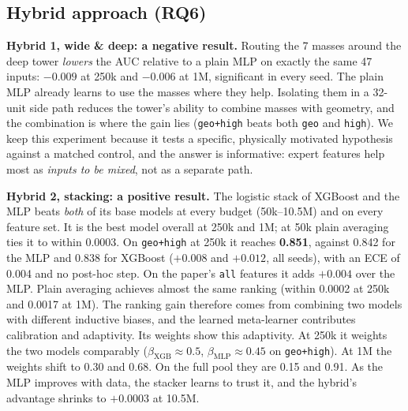 \subsection{Hybrid approach (RQ6)}
\textbf{Hybrid 1, wide \& deep: a negative result.} Routing the 7 masses around the deep tower
\emph{lowers} the AUC relative to a plain MLP on exactly the same 47 inputs: $-0.009$ at 250k and
$-0.006$ at 1M, significant in every seed. The plain MLP already learns to use the masses where they
help. Isolating them in a 32-unit side path reduces the tower's ability to combine masses with
geometry, and the combination is where the gain lies (\texttt{geo+high} beats both
\texttt{geo} and \texttt{high}). We keep this experiment because it tests a specific, physically
motivated hypothesis against a matched control, and the answer is informative: expert features help
most as \emph{inputs to be mixed}, not as a separate path.

\textbf{Hybrid 2, stacking: a positive result.} The logistic stack of XGBoost and the MLP beats
\emph{both} of its base models at every budget (50k--10.5M) and on every feature set. It is the best
model overall at 250k and 1M; at 50k plain averaging ties it to within 0.0003. On \texttt{geo+high}
at 250k it reaches
\textbf{0.851}, against 0.842 for the MLP and 0.838 for XGBoost ($+0.008$ and $+0.012$, all seeds),
with an ECE of 0.004 and no post-hoc step. On the paper's \texttt{all} features it adds $+0.004$ over
the MLP. Plain averaging achieves almost the same ranking (within 0.0002 at 250k and 0.0017 at 1M).
The ranking gain therefore comes from combining two models with different inductive biases, and the
learned meta-learner contributes calibration and adaptivity. Its weights show this adaptivity. At
250k it weights the two models comparably ($\beta_\mathrm{XGB}\approx0.5$,
$\beta_\mathrm{MLP}\approx0.45$ on \texttt{geo+high}). At 1M the weights shift to 0.30 and 0.68. On
the full pool they are 0.15 and 0.91. As the MLP improves with data, the stacker learns to trust it,
and the hybrid's advantage shrinks to $+0.0003$ at 10.5M.
